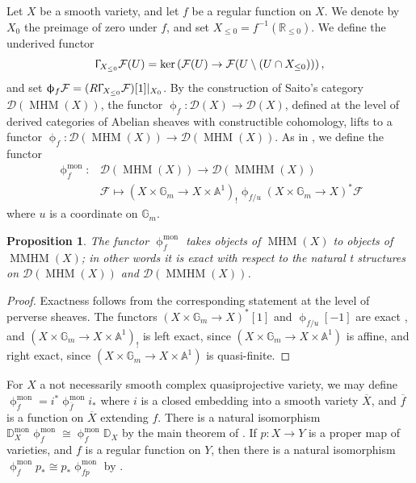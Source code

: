 \documentclass[a4paper,10pt]{amsart}
\newtheorem{proposition}[theorem]{Proposition}
\newcommand{\DD}{\mathbb{D}}
\newcommand{\phim}[1]{\phi^{\mon}_{#1}}
\renewcommand{\Gamma}{\Upgamma}
\renewcommand{\phi}{\upphi}
\DeclareMathOperator{\mon}{mon}
\DeclareMathOperator{\MMHM}{MMHM}
\DeclareMathOperator{\MHM}{MHM}
\newcommand{\Dub}{\mathcal{D}}
\begin{document}
Let $X$ be a smooth variety, and let $f$ be a regular function on $X$.  We denote by $X_0$ the preimage of zero under $f$, and set $X_{\leq 0}=f^{-1}(\mathbb{R}_{\leq 0})$.  We define the underived functor
\[
\Gamma_{X_{\leq 0}}\mathcal{F}(U)=\ker\left(\mathcal{F}(U)\rightarrow \mathcal{F}(U\setminus (U\cap X_{\leq 0}))\right), 
\]
and set $\phi_f\mathcal{F}=(R\Gamma_{X_{\leq 0}}\mathcal{F})[1]|_{X_0}$.  By the construction of Saito's category $\Dub(\MHM(X))$, the functor $\phi_f\colon \Dub(X)\rightarrow \Dub(X)$, defined at the level of derived categories of Abelian sheaves with constructible cohomology, lifts to a functor $\phi_f\colon \Dub(\MHM(X))\rightarrow \Dub(\MHM(X))$.  As in \cite[Sec.7]{COHA}, we define the functor
\begin{align*}
\phim{f}\colon&\Dub(\MHM(X))\rightarrow \Dub(\MMHM(X))\\
&\mathcal{F}\mapsto (X\times\mathbb{G}_m\rightarrow X\times \mathbb{A}^1)_!\phi_{f/u}(X\times\mathbb{G}_m\rightarrow X)^*\mathcal{F}
\end{align*}
where $u$ is a coordinate on $\mathbb{G}_m$.  
\begin{proposition}\label{exactness}
The functor $\phim{f}$ takes objects of $\MHM(X)$ to objects of $\MMHM(X)$; in other words it is exact with respect to the natural t structures on $\Dub(\MHM(X))$ and $\Dub(\MMHM(X))$.  
\end{proposition}
\begin{proof}
Exactness follows from the corresponding statement at the level of perverse sheaves.  The functors $(X\times\mathbb{G}_m\rightarrow X)^*[1]$ and $\phi_{f/u}[-1]$ are exact \cite{BBD}, and $(X\times\mathbb{G}_m\rightarrow X\times \mathbb{A}^1)_!$ is left exact, since $(X\times\mathbb{G}_m\rightarrow X\times \mathbb{A}^1)$ is affine, and right exact, since $(X\times\mathbb{G}_m\rightarrow X\times \mathbb{A}^1)$ is quasi-finite.
\end{proof}

For $X$ a not necessarily smooth complex quasiprojective variety, we may define $\phim{f}=i^*\phim{\overline{f}}i_*$ where $i$ is a closed embedding into a smooth variety $\overline{X}$, and $\overline{f}$ is a function on $\overline{X}$ extending $f$.  There is a natural isomorphism $\DD_{X}^{\mon}\phi^{\mon}_f\cong \phi^{\mon}_f\DD_X$ by the main theorem of \cite{Sai89duality}.  If $p\colon X\rightarrow Y$ is a proper map of varieties, and $f$ is a regular function on $Y$, then there is a natural isomorphism $\phim{f}p_*\cong p_*\phim{fp}$ by \cite[Thm.2.14]{Sai90}.  
\end{document}
